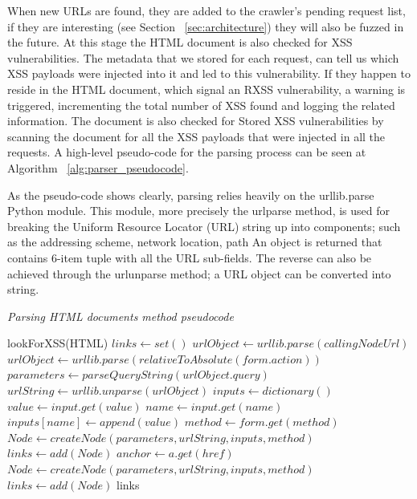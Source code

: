 When new URLs are found, they are added to the crawler's pending request list, if they are interesting (see Section ~\ref{sec:architecture}) they will also be fuzzed in the future. At this stage the HTML document is also checked for XSS vulnerabilities. The metadata that we stored for each request, can tell us which XSS payloads were injected into it and led to this vulnerability. If they happen to reside in the HTML document, which signal an RXSS vulnerability, a warning is triggered, incrementing the total number of XSS found and logging the related information. The document is also checked for Stored XSS vulnerabilities by scanning the document for all the XSS payloads that were injected in all the requests. A high-level pseudo-code for the parsing process can be seen at Algorithm ~\ref{alg:parser_pseudocode}. 

As the pseudo-code shows clearly, parsing relies heavily on the urllib.parse~\cite{urllib_parse} Python module. This module, more precisely the urlparse method, is used for breaking the Uniform Resource Locator (URL) string up into components; such as the addressing scheme, network location, path \etc An object is returned that contains 6-item tuple with all the URL sub-fields. The reverse can also be achieved through the urlunparse method; a URL object can be converted into string.

\begin{algorithm}
 
 \caption{\textit{Parsing HTML documents method pseudocode}}
 \label{alg:parser_pseudocode}
 
 \begin{algorithmic}
	\STATE lookForXSS(HTML)  
	\STATE $links \leftarrow set()$ 
 			\STATE $urlObject \leftarrow urllib.parse(callingNodeUrl)$
		 \ELSE 
 			\STATE $urlObject \leftarrow urllib.parse(relativeToAbsolute(form.action))$
		 \ENDIF
		\STATE $parameters \leftarrow parseQueryString(urlObject.query)$ 
		\STATE $urlString \leftarrow urllib.unparse(urlObject)$ 
		\STATE $inputs \leftarrow dictionary()$ 
			\STATE $value \leftarrow input.get(value)$			 
	 		\STATE $name \leftarrow input.get(name)$	
	 		\STATE $inputs[name] \leftarrow append(value)$	 
		\ENDFOR
		\STATE $method \leftarrow form.get(method)$	
		\STATE $Node \leftarrow createNode(parameters, urlString, inputs, method)$	
		\STATE $links \leftarrow add(Node)$
			\STATE $anchor \leftarrow a.get(href)$			 
		\ENDFOR
		\STATE $Node \leftarrow createNode(parameters, urlString, inputs, method)$	
		\STATE $links \leftarrow add(Node)$
	\ENDFOR
	\RETURN links
 \end{algorithmic}
\end{algorithm}

